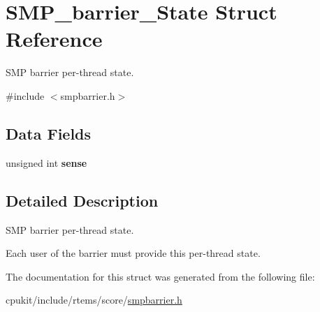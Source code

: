 \hypertarget{structSMP__barrier__State}{}\section{S\+M\+P\+\_\+barrier\+\_\+\+State Struct Reference}
\label{structSMP__barrier__State}


S\+MP barrier per-\/thread state.  




{\ttfamily \#include $<$smpbarrier.\+h$>$}

\subsection*{Data Fields}
\begin{DoxyCompactItemize}
\item 
\mbox{\label{structSMP__barrier__State_a64c6af0e143239280c0e748ebc1465d8}} 
unsigned int {\bfseries sense}
\end{DoxyCompactItemize}


\subsection{Detailed Description}
S\+MP barrier per-\/thread state. 

Each user of the barrier must provide this per-\/thread state. 

The documentation for this struct was generated from the following file\+:\begin{DoxyCompactItemize}
\item 
cpukit/include/rtems/score/\mbox{\hyperlink{smpbarrier_8h}{smpbarrier.\+h}}\end{DoxyCompactItemize}

